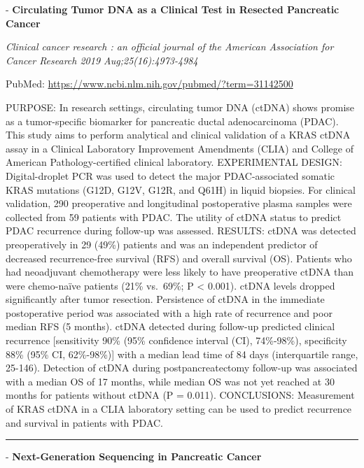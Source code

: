 \documentclass[]{article}
\begin{document}
 - \textbf{Circulating Tumor DNA as a Clinical Test in Resected
Pancreatic Cancer}

\emph{Clinical cancer research : an official journal of the American
Association for Cancer Research 2019 Aug;25(16):4973-4984}

PubMed: \url{https://www.ncbi.nlm.nih.gov/pubmed/?term=31142500}

PURPOSE: In research settings, circulating tumor DNA (ctDNA) shows
promise as a tumor-specific biomarker for pancreatic ductal
adenocarcinoma (PDAC). This study aims to perform analytical and
clinical validation of a KRAS ctDNA assay in a Clinical Laboratory
Improvement Amendments (CLIA) and College of American
Pathology-certified clinical laboratory. EXPERIMENTAL DESIGN:
Digital-droplet PCR was used to detect the major PDAC-associated somatic
KRAS mutations (G12D, G12V, G12R, and Q61H) in liquid biopsies. For
clinical validation, 290 preoperative and longitudinal postoperative
plasma samples were collected from 59 patients with PDAC. The utility of
ctDNA status to predict PDAC recurrence during follow-up was assessed.
RESULTS: ctDNA was detected preoperatively in 29 (49\%) patients and was
an independent predictor of decreased recurrence-free survival (RFS) and
overall survival (OS). Patients who had neoadjuvant chemotherapy were
less likely to have preoperative ctDNA than were chemo-naïve patients
(21\% vs.~69\%; P \textless{} 0.001). ctDNA levels dropped significantly
after tumor resection. Persistence of ctDNA in the immediate
postoperative period was associated with a high rate of recurrence and
poor median RFS (5 months). ctDNA detected during follow-up predicted
clinical recurrence {[}sensitivity 90\% (95\% confidence interval (CI),
74\%-98\%), specificity 88\% (95\% CI, 62\%-98\%){]} with a median lead
time of 84 days (interquartile range, 25-146). Detection of ctDNA during
postpancreatectomy follow-up was associated with a median OS of 17
months, while median OS was not yet reached at 30 months for patients
without ctDNA (P = 0.011). CONCLUSIONS: Measurement of KRAS ctDNA in a
CLIA laboratory setting can be used to predict recurrence and survival
in patients with PDAC.

{}

{}

\begin{center}\rule{0.5\linewidth}{\linethickness}\end{center}

 - \textbf{Next-Generation Sequencing in Pancreatic Cancer}
\end{document}
